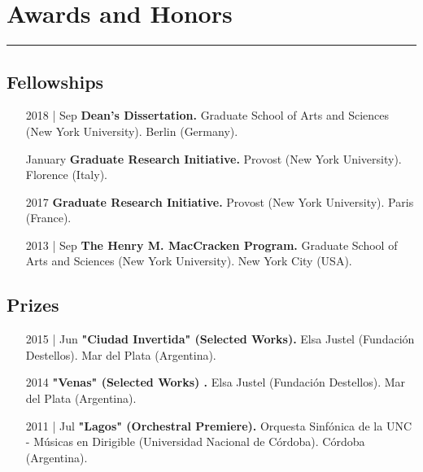 \documentclass[12pt]{article}%
\begin{document}
%
\section{Awards and Honors}%
\label{sec:AwardsandHonors}%
\hrule%
\subsection{Fellowships}%
\begin{itemize}[align=parleft,leftmargin=2.25cm,labelwidth=2cm]
\item[2018 | Sep]
\textbf{Dean's Dissertation.}
Graduate School of Arts and Sciences (New York University). 
Berlin (Germany). 
\end{itemize}%
\begin{itemize}[align=parleft,leftmargin=2.25cm,labelwidth=2cm]
\item[January]
\textbf{Graduate Research Initiative.}
Provost (New York University). 
Florence (Italy). 
\end{itemize}%
\begin{itemize}[align=parleft,leftmargin=2.25cm,labelwidth=2cm]
\item[2017]
\textbf{Graduate Research Initiative.}
Provost (New York University). 
Paris (France). 
\end{itemize}%
\begin{itemize}[align=parleft,leftmargin=2.25cm,labelwidth=2cm]
\item[2013 | Sep]
\textbf{The Henry M. MacCracken Program.}
Graduate School of Arts and Sciences (New York University). 
New York City (USA). 
\end{itemize}%
\subsection{Prizes}%
\begin{itemize}[align=parleft,leftmargin=2.25cm,labelwidth=2cm]
\item[2015 | Jun]
\textbf{"Ciudad Invertida" (Selected Works).}
Elsa Justel (Fundación Destellos). 
Mar del Plata (Argentina). 
\end{itemize}%
\begin{itemize}[align=parleft,leftmargin=2.25cm,labelwidth=2cm]
\item[2014]
\textbf{"Venas" (Selected Works) .}
Elsa Justel (Fundación Destellos). 
Mar del Plata (Argentina). 
\end{itemize}%
\begin{itemize}[align=parleft,leftmargin=2.25cm,labelwidth=2cm]
\item[2011 | Jul]
\textbf{"Lagos" (Orchestral Premiere).}
Orquesta Sinfónica de la UNC {-} Músicas en Dirigible (Universidad Nacional de Córdoba). 
Córdoba (Argentina). 
\end{itemize}%
\end{document}
